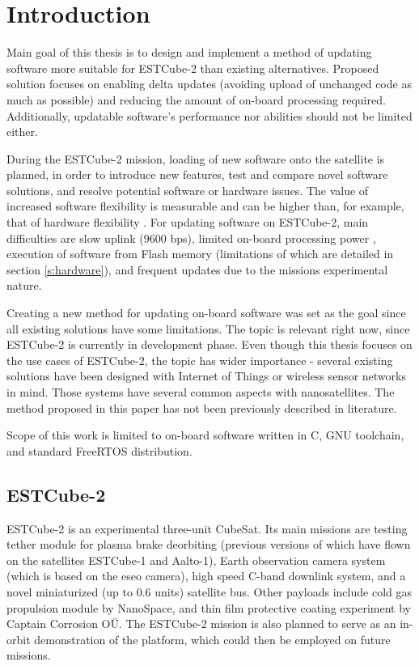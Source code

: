 \newpage
\section{Introduction}

Main goal of this thesis is to design and implement a method of updating software more suitable for ESTCube-2 than existing alternatives. Proposed solution focuses on enabling delta updates (avoiding upload of unchanged code as much as possible) and reducing the amount of on-board processing required. Additionally, updatable software's performance nor abilities should not be limited either.

During the ESTCube-2 mission, loading of new software onto the satellite is planned, in order to introduce new features, test and compare novel software solutions, and resolve potential software or hardware issues. The value of increased software flexibility is measurable and can be higher than, for example, that of hardware flexibility \cite{Nilchiani2009}. For updating software on ESTCube-2, main difficulties are slow uplink (9600 bps), limited on-board processing power \cite{Ehrpais2016}, execution of software from Flash memory \cite{Haljaste2017} (limitations of which are detailed in section \ref{s:hardware}), and frequent updates due to the missions experimental nature.

Creating a new method for updating on-board software was set as the goal since all existing solutions have some limitations. The topic is relevant right now, since ESTCube-2 is currently in development phase. Even though this thesis focuses on the use cases of ESTCube-2, the topic has wider importance - several existing solutions have been designed with Internet of Things or wireless sensor networks \cite{Dunkels2006,Han2005} in mind. Those systems have several common aspects with nanosatellites. The method proposed in this paper has not been previously described in literature.

Scope of this work is limited to on-board software written in C, GNU toolchain, and standard FreeRTOS distribution.

\subsection{ESTCube-2}

ESTCube-2 is an experimental three-unit CubeSat. Its main missions are testing tether module for plasma brake deorbiting (previous versions of which have flown on the satellites ESTCube-1 and Aalto-1), Earth observation camera system (which is based on the \gls{eseo} camera), high speed C-band downlink system, and a novel miniaturized (up to 0.6 units) satellite bus. Other payloads include cold gas propulsion module by NanoSpace, and thin film protective coating experiment by Captain Corrosion OÜ. The ESTCube-2 mission is also planned to serve as an in-orbit demonstration of the platform, which could then be employed on future missions. \cite{Iakubivskyi2016}

